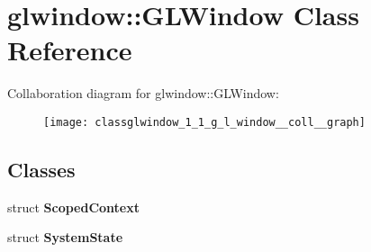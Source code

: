 \section{glwindow\+:\+:G\+L\+Window Class Reference}
\label{classglwindow_1_1_g_l_window}


Collaboration diagram for glwindow\+:\+:G\+L\+Window\+:\nopagebreak
\begin{figure}[H]
\begin{center}
\leavevmode
\texttt{[image: classglwindow\_1\_1\_g\_l\_window\_\_coll\_\_graph]}
\end{center}
\end{figure}
\subsection*{Classes}
\begin{DoxyCompactItemize}
\item 
struct \textbf{ Scoped\+Context}
\item 
struct \textbf{ System\+State}
\end{DoxyCompactItemize}
